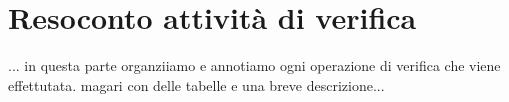 \section{Resoconto attività di verifica}
... in questa parte organziiamo e annotiamo ogni operazione di verifica che viene effettutata. magari con delle tabelle e una breve descrizione...